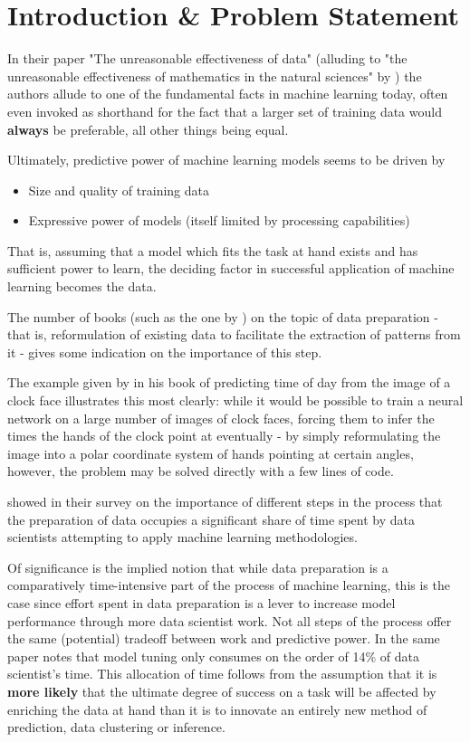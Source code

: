 \chapter{Introduction \& Problem Statement}
\label{chapter:intro}

In their paper "The unreasonable effectiveness of data" \cite{norvig_eod} (alluding to "the unreasonable effectiveness of mathematics in the natural sciences" by \cite{mathematics_unreasonable}) the authors allude to one of the fundamental facts in machine learning today, often even invoked as shorthand for the fact that a larger set of training data would \textbf{always} be preferable, all other things being equal.

Ultimately, predictive power of machine learning models seems to be driven by

\begin{itemize}
	\item Size and quality of training data
	\item Expressive power of models (itself limited by processing capabilities)
\end{itemize}

That is, assuming that a model which fits the task at hand exists and has sufficient power to learn, the deciding factor in successful application of machine learning becomes the data.

The number of books (such as the one by \cite{dataprep}) on the topic of data preparation - that is, reformulation of existing data to facilitate the extraction of patterns from it -  gives some indication on the importance of this step. 

The example given by \cite{geron2019hands} in his book of predicting time of day from the image of a clock face illustrates this most clearly: while it would be possible to train a neural network on a large number of images of clock faces, forcing them to infer the times the hands of the clock point at eventually - by simply reformulating the image into a polar coordinate system of hands pointing at certain angles, however, the problem may be solved directly with a few lines of code.

\cite{datawrangling_time} showed in their survey on the importance of different steps in the process that the preparation of data occupies a significant share of time spent by data scientists attempting to apply machine learning methodologies.

Of significance is the implied notion that while data preparation is a comparatively time-intensive part of the process of machine learning, this is the case since effort spent in data preparation is a lever to increase model performance through more data scientist work. Not all steps of the process offer the same (potential) tradeoff between work and predictive power. In the same paper \cite{datawrangling_time} notes that model tuning only consumes on the order of 14\% of data scientist's time. This allocation of time follows from the assumption that it is \textbf{more likely} that the ultimate degree of success on a task will be affected by enriching the data at hand than it is to innovate an entirely new method of prediction, data clustering or inference.

